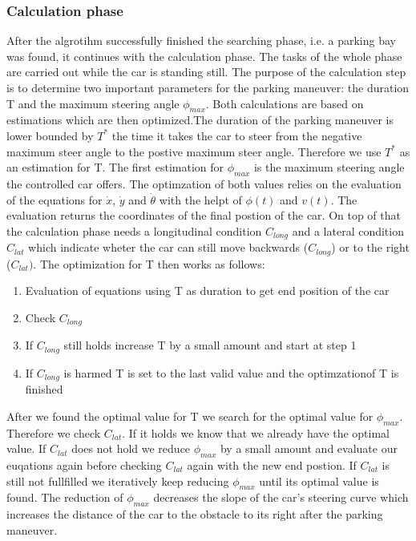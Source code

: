\documentclass[paper=a4, fontsize=11pt]{scrreprt}
\begin{document}
\subsubsection{Calculation phase} \label{calculating}
After the algrotihm successfully finished the searching phase, i.e. a parking bay was found, it continues with the calculation phase. The tasks of the whole phase are carried out while the car is standing still. The purpose of the calculation step is to determine two important parameters for the parking maneuver: the duration T and the maximum steering angle $\phi_{max}$. Both calculations are based on estimations which are then optimized.The duration of the parking maneuver is lower bounded by $T^*$ the time it takes the car to steer from the negative maximum steer angle to the postive maximum steer angle. Therefore we use $T^*$ as an estimation for T. The first estimation for $\phi_{max}$ is the maximum steering angle the controlled car offers. The optimzation of both values relies on the evaluation of the equations for $\dot{x}$, $\dot{y}$ and $\dot{\theta}$ with the helpt of $\phi(t)$ and $v(t)$. The evaluation returns the coordinates of the final postion of the car. On top of that the calculation phase needs a longitudinal condition $C_{long}$ and a lateral condition $C_{lat}$ which indicate wheter the car can still move backwards ($C_{long}$) or to the right ($C_{lat})$. The optimization for T then works as follows:
\begin{enumerate}
	\item Evaluation of equations using T as duration to get end position of the car
	\item Check $C_{long}$
	\item If $C_{long}$ still holds increase T by a small amount and start at step 1
	\item If $C_{long}$ is harmed T is set to the last valid value and the optimzationof T is finished
\end{enumerate}
After we found the optimal value for T we search for the optimal value for $\phi_{max}$. Therefore we check $C_{lat}$. If it holds we know that we already have the optimal value. If $C_{lat}$ does not hold we reduce $\phi_{max}$ by a small amount and evaluate our euqations again before checking $C_{lat}$ again with the new end postion. If $C_{lat}$ is still not fullfilled we iteratively keep reducing $\phi_{max}$ until its optimal value is found. The reduction of $\phi_{max}$ decreases the slope of the car's steering curve which increases the distance of the car to the obstacle to its right after the parking maneuver.
\end{document}
